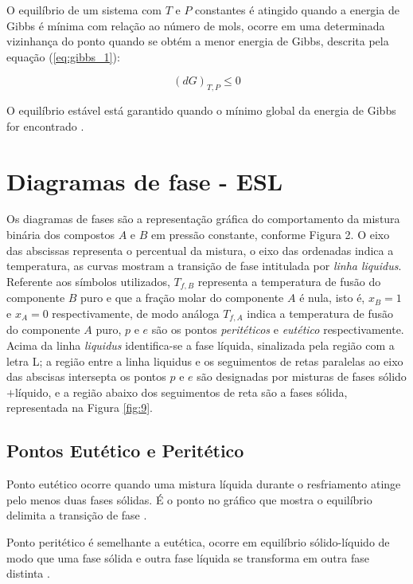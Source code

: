 O equilíbrio de um sistema com $T$ e $P$ constantes é atingido quando a energia de Gibbs é mínima com relação ao número de mols, ocorre em uma determinada vizinhança do ponto quando se obtém a menor energia de Gibbs, descrita pela equação (\ref{eq:gibbs_1}):
	
\begin{equation}\label{eq:gibbs_1}
	(dG)_{T,P}\leq 0
\end{equation}

O equilíbrio estável está garantido quando o mínimo global da energia de Gibbs for encontrado \cite{Rocha2011}.

\section{Diagramas de fase - ESL}
	
Os diagramas de fases são a representação gráfica do comportamento da mistura binária dos compostos $A$ e $B$ em pressão constante, conforme Figura 2. O eixo das abscissas representa o percentual da mistura, o eixo das ordenadas indica a temperatura, as curvas mostram a transição de fase intitulada por \textit{linha liquidus}. Referente aos símbolos utilizados, $T_{f,B}$ representa a temperatura de fusão do componente $B$ puro e que a fração molar do componente $A$ é nula, isto é, $x_B=1$ e $x_A=0$ respectivamente, de modo análoga $T_{f,A}$ indica a temperatura de fusão do componente $A$ puro, $p$ e $e$ são os pontos \textit{peritéticos} e \textit{eutético} respectivamente. Acima da linha \textit{liquidus} identifica-se a fase líquida, sinalizada pela região com a letra L; a região entre a linha liquidus e os seguimentos de retas paralelas ao eixo das abscisas intersepta os pontos $p$ e $e$ são designadas por misturas de fases sólido$+$líquido, e a região abaixo dos seguimentos de reta são a fases sólida, representada na Figura \ref{fig:9}. \cite{Rocha2011}


\subsection{Pontos Eutético e Peritético}
	
\hspace{0.5cm} Ponto eutético ocorre quando uma mistura líquida durante o resfriamento atinge pelo menos duas fases sólidas. É o ponto no gráfico que mostra o equilíbrio delimita a transição de fase \cite{Rocha2011}. 

Ponto peritético é semelhante a eutética, ocorre em equilíbrio sólido-líquido de modo que uma fase sólida e outra fase líquida se transforma em outra fase distinta \cite{Rocha2011}.
	
